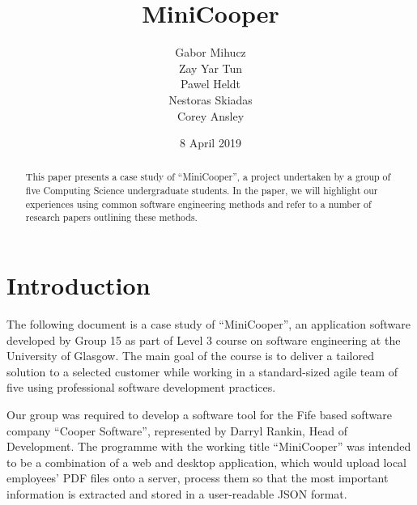 \documentclass{l3proj}
\begin{document}
\title{MiniCooper}

\author{Gabor Mihucz \\
        Zay Yar Tun \\
        Pawel Heldt \\
        Nestoras Skiadas \\
        Corey Ansley}

\date{8 April 2019}

\maketitle

\begin{abstract}

This paper presents a case study of ``MiniCooper'', a project undertaken by a group of five Computing Science undergraduate students. In the paper, we will highlight our experiences using common software engineering methods and refer to a number of research papers outlining these methods.

\end{abstract}

\educationalconsent

\newpage

\clearpage
\setcounter{page}{1}
\section{Introduction}

The following document is a case study of ``MiniCooper'', an application software developed by Group 15 as part of Level 3 course on software engineering at the University of Glasgow. The main goal of the course is to deliver a tailored solution to a selected customer while working in a standard-sized agile team of five using professional software development practices.

Our group was required to develop a software tool for the Fife based software company ``Cooper Software'', represented by  Darryl Rankin, Head of Development. The programme with the working title ``MiniCooper'' was intended to be a combination of a web and desktop application, which would upload local employees’ PDF files onto a server, process them so that the most important information is extracted and stored in a user-readable JSON format.
\end{document}
